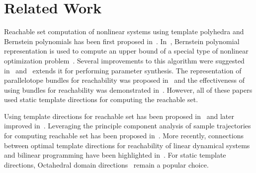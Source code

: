 \section{Related Work}

Reachable set computation of nonlinear systems using template polyhedra and Bernstein polynomials has been first proposed in~\cite{dang2009image}.
%
In~\cite{dang2009image}, Bernstein polynomial representation is used to compute an upper bound of a special type of nonlinear optimization problem~\cite{garloff2003bernstein}.
%
Several improvements to this algorithm were suggested in~\cite{dang2012reachability,sassi2021reachability} and~\cite{dang2014parameter} extends it for performing parameter synthesis.
%
The representation of parallelotope bundles for reachability was proposed in~\cite{dreossi2016parallelotope} and the effectiveness of using bundles for reachability was demonstrated in~\cite{dreossi2017sapo,dreossi2017reachability}.
%
However, all of these papers used static template directions for computing the reachable set.

Using template directions for reachable set has been proposed in~\cite{sankaranarayanan2008symbolic} and later improved in~\cite{dang2011template}.
%
Leveraging the principle component analysis of sample trajectories for computing reachable set has been proposed in~\cite{stursberg2003efficient,chen2011choice,seladji2017finding}.
%
More recently, connections between optimal template directions for reachability of linear dynamical systems and bilinear programming have been highlighted in~\cite{gronski2019template}.
%
For static template directions, Octahedral domain directions~\cite{clariso2004octahedron} remain a popular choice.